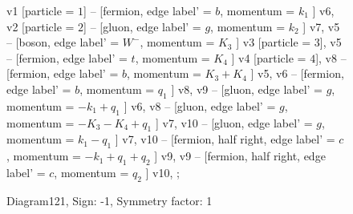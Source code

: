 \documentclass{revtex4}
\begin{document}
\begin{figure}[!htb]
\begin{center}
{    %
v1 [particle = \(1\)] -- [fermion, edge label' = \(b\), momentum = \(k_{1}\) ] v6, 
v2 [particle = \(2\)] -- [gluon, edge label' = \(g\), momentum = \(k_{2}\) ] v7, 
v5 -- [boson, edge label' = \(W^{-}\), momentum = \(K_{3}\) ] v3 [particle = \(3\)], 
v5 -- [fermion, edge label' = \(t\), momentum = \(K_{4}\) ] v4 [particle = \(4\)], 
v8 -- [fermion, edge label' = \(b\), momentum = \(K_{3} + K_{4}\) ] v5, 
v6 -- [fermion, edge label' = \(b\), momentum = \(q_{1}\) ] v8, 
v9 -- [gluon, edge label' = \(g\), momentum = \(-k_{1} + q_{1}\) ] v6, 
v8 -- [gluon, edge label' = \(g\), momentum = \(-K_{3} - K_{4} + q_{1}\) ] v7, 
v10 -- [gluon, edge label' = \(g\), momentum = \(k_{1} - q_{1}\) ] v7, 
v10 -- [fermion, half right, edge label' = \(c\), momentum = \(-k_{1} + q_{1} + q_{2}\) ] v9, 
v9 -- [fermion, half right, edge label' = \(c\), momentum = \(q_{2}\) ] v10, 
};
\end{center}
\caption{Diagram121, Sign: -1, Symmetry factor: 1}
\end{figure}
\newpage
\end{document}
